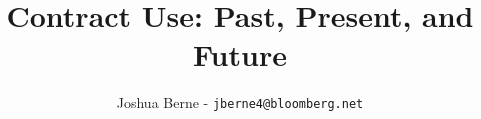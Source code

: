 
\title{Contract Use: Past, Present, and Future}
\author[Berne]{Joshua Berne - \texttt{jberne4@bloomberg.net}}

